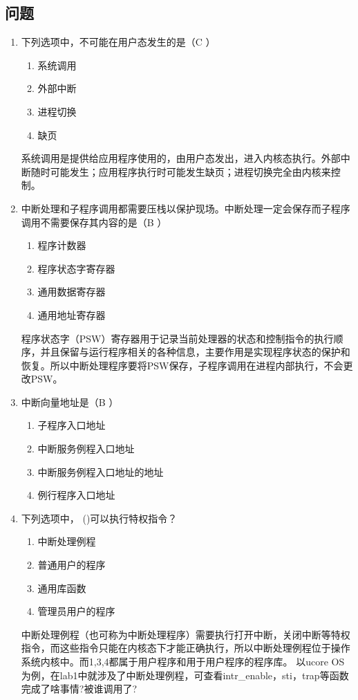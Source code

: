 \subsection{问题}
\begin{enumerate}
	\item 下列选项中，不可能在用户态发生的是（C ）
	\begin{enumerate}[A]
		\item 系统调用
		\item 外部中断
		\item 进程切换
		\item 缺页
	\end{enumerate}
系统调用是提供给应用程序使用的，由用户态发出，进入内核态执行。外部中断随时可能发生；应用程序执行时可能发生缺页；进程切换完全由内核来控制。
\item 中断处理和子程序调用都需要压栈以保护现场。中断处理一定会保存而子程序调用不需要保存其内容的是（B ）
\begin{enumerate}[A]
	\item 程序计数器
	\item 程序状态字寄存器
	\item 通用数据寄存器
	\item 通用地址寄存器
\end{enumerate}
程序状态字（PSW）寄存器用于记录当前处理器的状态和控制指令的执行顺序，并且保留与运行程序相关的各种信息，主要作用是实现程序状态的保护和恢复。所以中断处理程序要将PSW保存，子程序调用在进程内部执行，不会更改PSW。


\item 中断向量地址是（B ）
\begin{enumerate}[A]
	\item 子程序入口地址
	\item 中断服务例程入口地址
	\item 中断服务例程入口地址的地址
	\item 例行程序入口地址
\end{enumerate}
\item 下列选项中， ()可以执行特权指令？
\begin{enumerate}[A]
	\item 中断处理例程
	\item 普通用户的程序
	\item 通用库函数
	\item 管理员用户的程序
\end{enumerate}
中断处理例程（也可称为中断处理程序）需要执行打开中断，关闭中断等特权指令，而这些指令只能在内核态下才能正确执行，所以中断处理例程位于操作系统内核中。而1,3,4都属于用户程序和用于用户程序的程序库。 以ucore OS为例，在lab1中就涉及了中断处理例程，可查看intr\_enable，sti，trap等函数完成了啥事情?被谁调用了?



\end{enumerate}
